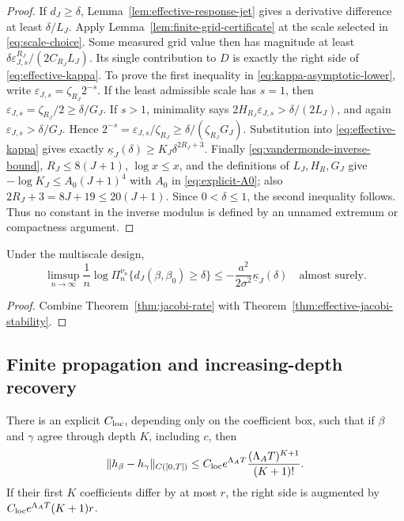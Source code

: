 \begin{proof}
If \(d_J\ge\delta\), Lemma~\ref{lem:effective-response-jet} gives a
derivative difference at least \(\delta/L_J\).  Apply
Lemma~\ref{lem:finite-grid-certificate} at the scale selected in
\eqref{eq:scale-choice}.  Some measured grid value then has magnitude at
least
\(\delta\varepsilon_{J,s}^{R_J}/(2C_{R_J}L_J)\).  Its single contribution
to \(D\) is exactly the right side of \eqref{eq:effective-kappa}.
To prove the first inequality in \eqref{eq:kappa-asymptotic-lower}, write
\(\varepsilon_{J,s}=\zeta_{R_J}2^{-s}\).  If the least admissible scale has
\(s=1\), then \(\varepsilon_{J,s}=\zeta_{R_J}/2\ge\delta/G_J\).  If
\(s>1\), minimality says
\(2H_{R_J}\varepsilon_{J,s}>\delta/(2L_J)\), and again
\(\varepsilon_{J,s}>\delta/G_J\).  Hence
\(2^{-s}=\varepsilon_{J,s}/\zeta_{R_J}
\ge\delta/(\zeta_{R_J}G_J)\).  Substitution into
\eqref{eq:effective-kappa} gives exactly
\(\underline\kappa_J(\delta)\ge K_J\delta^{2R_J+3}\).
Finally \eqref{eq:vandermonde-inverse-bound},
\(R_J\le8(J+1)\), \(\log x\le x\), and the definitions of
\(L_J,H_R,G_J\) give
\(-\log K_J\le A_0(J+1)^4\) with \(A_0\) in
\eqref{eq:explicit-A0}; also \(2R_J+3=8J+19\le20(J+1)\).
Since \(0<\delta\le1\), the second inequality follows.  Thus no constant in
the inverse modulus is defined by an unnamed extremum or compactness
argument.
\end{proof}

\begin{corollary}
\label{cor:effective-cylinder-rate}
Under the multiscale design,
\begin{equation}
 \limsup_{n\to\infty}\frac1n
 \log\Pi_n^{\nu_n}\{d_J(\beta,\beta_0)\ge\delta\}
 \le-\frac{a^2}{2\sigma^2}\underline\kappa_J(\delta)
 \quad\text{almost surely}.
 \label{eq:effective-cylinder-posterior}
\end{equation}
\end{corollary}

\begin{proof}
Combine Theorem~\ref{thm:jacobi-rate} with
Theorem~\ref{thm:effective-jacobi-stability}.
\end{proof}

\subsection{Finite propagation and increasing-depth recovery}

\begin{lemma}
\label{lem:jacobi-boundary-locality}
There is an explicit \(C_{\rm loc}\), depending only on the coefficient box,
such that if \(\beta\) and \(\gamma\) agree through depth \(K\), including
\(c\), then
\begin{equation}
 \|h_\beta-h_\gamma\|_{C([0,T])}
 \le C_{\rm loc}e^{\Lambda_AT}
       \frac{(\Lambda_AT)^{K+1}}{(K+1)!}.
 \label{eq:factorial-boundary-locality}
\end{equation}
If their first \(K\) coefficients differ by at most \(r\), the right side is
augmented by \(C_{\rm loc}e^{\Lambda_AT}(K+1)r\).
\end{lemma}

